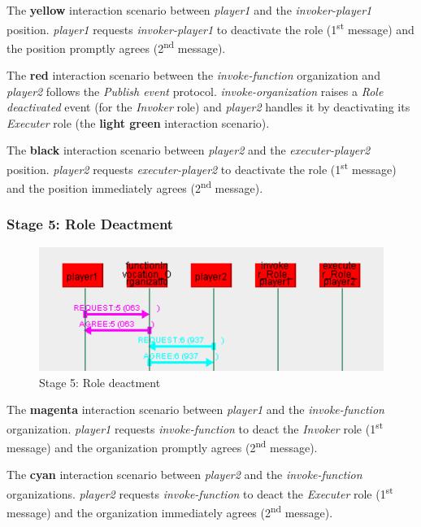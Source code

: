 The \textbf{yellow} interaction scenario between \textit{player1}  and the \textit{invoker-player1} position.
\textit{player1} requests \textit{invoker-player1} to deactivate the role (1\textsuperscript{st} message) and the position promptly agrees (2\textsuperscript{nd} message).

The \textbf{red} interaction scenario between the \textit{invoke-function} organization and \textit{player2} follows the \textit{Publish event} protocol.
\textit{invoke-organization} raises a \textit{Role deactivated} event (for the \textit{Invoker} role) and \textit{player2} handles it by deactivating its \textit{Executer} role (the \textbf{light green} interaction scenario).

The \textbf{black} interaction scenario between \textit{player2} and the \textit{executer-player2} position.
\textit{player2} requests \textit{executer-player2} to deactivate the role (1\textsuperscript{st} message) and the position immediately agrees (2\textsuperscript{nd} message).

\subsubsection*{Stage 5: Role Deactment}

\begin{figure}[H]
	\centering
	\includegraphics[width=\textwidth]{images/examples/example1-stage5.png}
	\caption{Stage 5: Role deactment}
	\label{figure:example1-stage5}
\end{figure} 

The \textbf{magenta} interaction scenario between \textit{player1} and the \textit{invoke-function} organization.
\textit{player1} requests \textit{invoke-function} to deact the \textit{Invoker} role (1\textsuperscript{st} message) and the organization promptly agrees (2\textsuperscript{nd} message).

The \textbf{cyan} interaction scenario between \textit{player2} and the \textit{invoke-function} organizations.
\textit{player2} requests \textit{invoke-function} to deact the \textit{Executer} role (1\textsuperscript{st} message) and the organization immediately agrees (2\textsuperscript{nd} message).